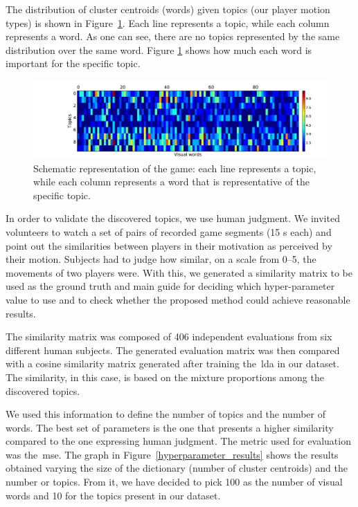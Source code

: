 The distribution of cluster centroids (words) given topics (our player motion types) is shown in Figure~\ref{fig:overall_game}.
Each line represents a topic, while each column represents a word. As one can see, there are no topics represented by the same distribution over the same word. Figure \ref{fig:overall_game} shows how much each word is important for the specific topic.

\begin{figure}[h]
	\centering
	\includegraphics[width=\textwidth]{images/05-modeling/lda_heatmap}
	\caption{Schematic representation of the game: each line represents a topic, while each column represents a word that is representative of the specific topic.}
  \label{fig:overall_game}
\end{figure}

In order to validate the discovered topics, we use human judgment. We invited volunteers to watch a set of pairs of recorded game segments (15 s each) and point out the similarities between players in their motivation as perceived by their motion. Subjects had to judge how similar, on a scale from 0--5, the movements of two players were. With this, we generated a similarity matrix to be used as the ground truth and main guide for deciding which hyper-parameter value to use and to check whether the proposed method could achieve reasonable results.

The similarity matrix was composed of 406 independent evaluations from six different human subjects. The generated evaluation matrix was then compared with a cosine similarity matrix generated after training the~\gls{lda} in our dataset. The similarity, in this case, is based on the mixture proportions among the discovered topics. 

We used this information to define the number of topics and the number of words. The best set of parameters is the one that presents a higher similarity compared to the one expressing human judgment. The metric used for evaluation was the~\gls{mse}. The graph in Figure~\ref{hyperparameter_results} shows the results obtained varying the size of the dictionary (number of cluster centroids) and the number or topics. From it, we have decided to pick 100 as the number of visual words and 10 for the topics present in our dataset.

